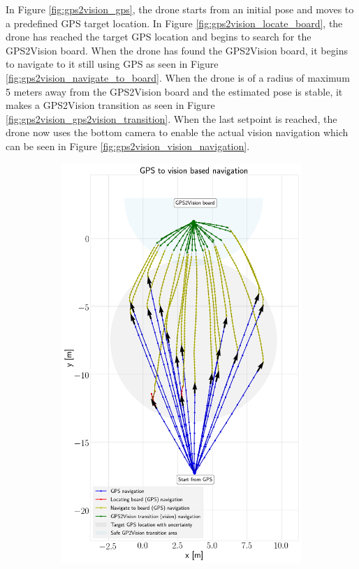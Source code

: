 \documentclass[../Head/report.tex]{subfiles}
\begin{document}
In Figure \ref{fig:gps2vision_gps}, the drone starts from an initial pose and moves to a predefined GPS target location. In Figure \ref{fig:gps2vision_locate_board}, the drone has reached the target GPS location and begins to search for the GPS2Vision board. When the drone has found the GPS2Vision board, it begins to navigate to it still using GPS as seen in Figure \ref{fig:gps2vision_navigate_to_board}. When the drone is of a radius of maximum 5 meters away from the GPS2Vision board and the estimated pose is stable, it makes a GPS2Vision transition as seen in Figure \ref{fig:gps2vision_gps2vision_transition}. When the last setpoint is reached, the drone now uses the bottom camera to enable the actual vision navigation which can be seen in Figure \ref{fig:gps2vision_vision_navigation}. 
  
\begin{figure}[H]
    \centering
    \begin{subfigure}[t]{.45\textwidth}
        \centering
        \includegraphics[width=\textwidth]{../Figures/GPS2Vision/test1_noWind_20_runs/gps2vision.png}

\end{subfigure}
\end{figure}
\end{document}
